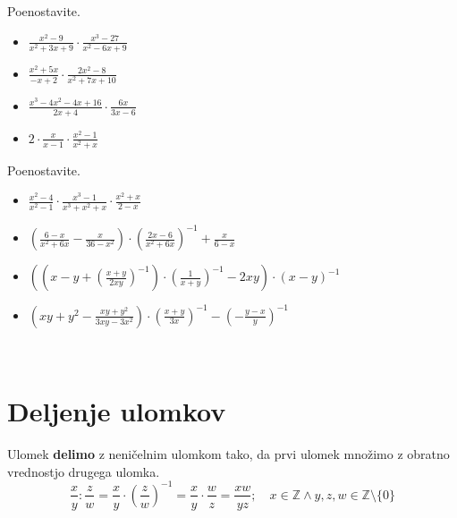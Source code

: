         
            \begin{naloga}
                Poenostavite.
                \begin{itemize}
                    \item $\frac{x^2-9}{x^2+3x+9}\cdot\frac{x^3-27}{x^2-6x+9}$ 
                    \item $\frac{x^2+5x}{-x+2}\cdot\frac{2x^2-8}{x^2+7x+10}$ 
                    \item $\frac{x^3-4x^2-4x+16}{2x+4}\cdot\frac{6x}{3x-6}$ 
                    \item $2\cdot\frac{x}{x-1}\cdot\frac{x^2-1}{x^2+x}$ 
                \end{itemize}
            \end{naloga}
        


        
            \begin{naloga}
                Poenostavite.
                \begin{itemize}
                    \item $\frac{x^2-4}{x^2-1}\cdot\frac{x^3-1}{x^3+x^2+x}\cdot\frac{x^2+x}{2-x}$ 
                    \item $\left(\frac{6-x}{x^2+6x}-\frac{x}{36-x^2}\right)\cdot\left(\frac{2x-6}{x^2+6x}\right)^{-1}+\frac{x}{6-x}$ 
                    \item $\left(\left(x-y+\left(\frac{x+y}{2xy}\right)^{-1}\right)\cdot\left(\frac{1}{x+y}\right)^{-1}-2xy\right)\cdot(x-y)^{-1}$ 
                    \item $\left(xy+y^2-\frac{xy+y^2}{3xy-3x^2}\right)\cdot\left(\frac{x+y}{3x}\right)^{-1}-\left(-\frac{y-x}{y}\right)^{-1}$ 
                \end{itemize}
            \end{naloga}
        


            ~

        \section{Deljenje ulomkov}

        
                Ulomek \textbf{delimo} z neničelnim ulomkom tako, da prvi ulomek množimo z obratno vrednostjo drugega ulomka.
                $$\dfrac{x}{y}:\dfrac{z}{w}=\dfrac{x}{y}\cdot\left(\dfrac{z}{w}\right)^{-1}=\dfrac{x}{y}\cdot\dfrac{w}{z}=\dfrac{xw}{yz}; \quad x\in\mathbb{Z}\land y,z,w\in\mathbb{Z}\setminus\{0\} $$
            

